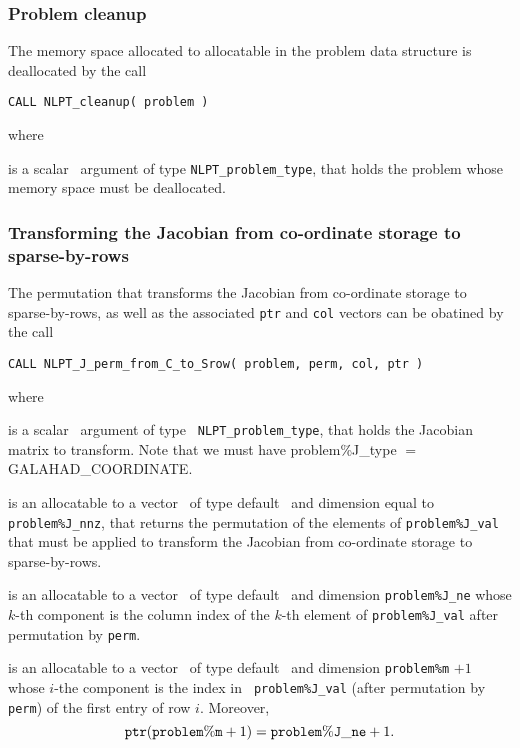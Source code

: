 \documentclass{galahad}
\newcommand{\packagename}{NLPT}
\newcommand{\sym}{\sf\small}
\begin{document}
\subsubsection{Problem cleanup}
\label{cleanup}

The memory space allocated to allocatable in the problem data structure is
deallocated by the call
\vspace*{1mm}

\hspace{8mm}
{\tt CALL \packagename\_cleanup( problem )}

\noindent where
\begin{description}
 is a scalar \intentin\ argument of type {\tt NLPT\_problem\_type},
that holds the problem whose memory space must be deallocated.
\end{description}

\subsubsection{Transforming the Jacobian from co-ordinate storage to
sparse-by-rows}
\label{toSrow}

The permutation that transforms the Jacobian from co-ordinate
storage to sparse-by-rows, as well as the associated {\tt ptr} and {\tt col}
vectors can be obatined by the call
\vspace*{1mm}

\hspace{8mm}
{\tt CALL \packagename\_J\_perm\_from\_C\_to\_Srow( problem, perm, col, ptr )}

\noindent where
\begin{description}
 is a scalar \intentin\ argument of type {\tt
NLPT\_problem\_type}, that holds the Jacobian matrix to transform. Note that
we must have {problem\%J\_type} $=$ {\sym GALAHAD\_COORDINATE}.

 is an allocatable to a vector \intentout\ of type default \integer\ and
dimension equal to {\tt problem\%J\_nnz}, that returns the permutation of the
elements of {\tt problem\%J\_val} that must be applied to transform the
Jacobian from co-ordinate storage to sparse-by-rows.

 is an allocatable to a vector \intentout\ of type default \integer\ and
dimension {\tt problem\%J\_ne} whose $k$-th component is the column index of
the $k$-th element of {\tt problem\%J\_val} after permutation by {\tt perm}.

 is an allocatable to a vector \intentout\ of type default \integer\ and
dimension {\tt problem\%m} $+1$ whose $i$-the component is the index in {\tt
problem\%J\_val} (after permutation by {\tt perm}) of the first entry of row
$i$. Moreover,
\[
{\tt ptr}({\tt problem\%m}+1 ) = {\tt problem\%J\_ne} + 1.
\]
\end{description}
\end{document}
